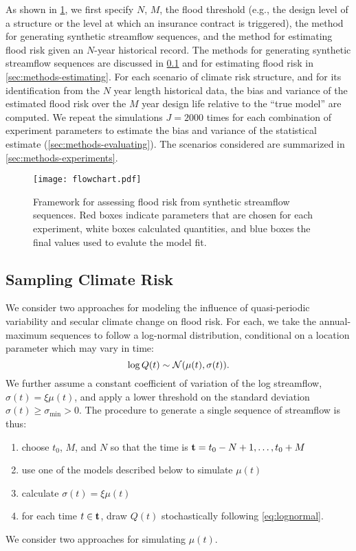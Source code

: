 \documentclass[
]{agujournal2018}
\makeatletter
\newcommand{\eg}{e.g.\@\xspace}
\newcommand{\normal}{\mathcal{N}}
\makeatother
\begin{document}
As shown in \cref{fig:methods-summary}, we first specify $N$, $M$, the flood threshold (\eg, the design level of a structure or the level at which an insurance contract is triggered), the method for generating synthetic streamflow sequences, and the method for estimating flood risk given an $N$-year historical record.
The methods for generating synthetic streamflow sequences are discussed in \cref{sec:methods-generating} and for estimating flood risk in \cref{sec:methods-estimating}.
For each scenario of climate risk structure, and for its identification from the $N$ year length historical data, the bias and variance of the estimated flood risk over the $M$ year design life relative to the ``true model'' are computed.
We repeat the simulations $J = 2000$ times for each combination of experiment parameters to estimate the bias and variance of the statistical estimate (\cref{sec:methods-evaluating}).
The scenarios considered are summarized in \cref{sec:methods-experiments}.
\begin{figure}
  \centering
  \texttt{[image: flowchart.pdf]}
  \caption{
    Framework for assessing flood risk from synthetic streamflow sequences.
    Red boxes indicate parameters that are chosen for each experiment, white boxes calculated quantities, and blue boxes the final values used to evalute the model fit.
  }\label{fig:methods-summary}
\end{figure}

\subsection{Sampling Climate Risk}\label{sec:methods-generating}

We consider two approaches for modeling the influence of quasi-periodic variability and secular climate change on flood risk.
For each, we take the annual-maximum sequences to follow a log-normal distribution, conditional on a location parameter which may vary in time:
\begin{equation} \label{eq:lognormal}
  \log Q(t) \sim \normal \qty(\mu(t), \sigma(t)).
\end{equation}
We further assume a constant coefficient of variation of the log streamflow, $\sigma(t) = \xi \mu(t)$, and apply a lower threshold on the standard deviation $\sigma(t) \geq \sigma_\text{min} > 0$.
The procedure to generate a single sequence of streamflow is thus:
\begin{enumerate}
  \item choose $t_0$, $M$, and $N$ so that the time is $\vb{t}=t_0-N+1, \ldots, t_0+M$
  \item use one of the models described below to simulate $\mu(t)$
  \item calculate $\sigma(t) = \xi \mu(t)$
  \item for each time $t \in \vb{t}$, draw $Q(t)$ stochastically following \cref{eq:lognormal}.
\end{enumerate}
We consider two approaches for simulating $\mu(t)$.
\end{document}

